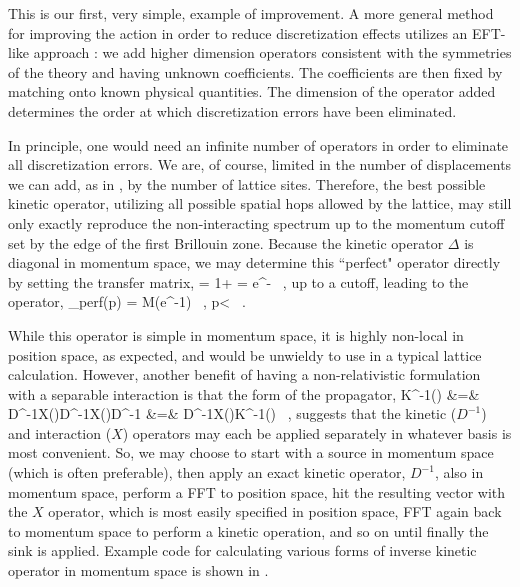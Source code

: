 This is our first, very simple, example of improvement. A more general method for improving the action in order to reduce discretization effects utilizes an EFT-like approach \cite{Symanzik1,Symanzik2,Symanzik3,Symanzik4,EKLN4}: we add higher dimension operators consistent with the symmetries of the theory and having unknown coefficients. The coefficients are then fixed by matching onto known physical quantities. The dimension of the operator added determines the order at which discretization errors have been eliminated.

In principle, one would need an infinite number of operators in order to eliminate all discretization errors. We are, of course, limited in the number of displacements we can add, as in , by the number of lattice sites. Therefore, the best possible kinetic operator, utilizing all possible spatial hops allowed by the lattice, may still only exactly reproduce the non-interacting spectrum up to the momentum cutoff set by the edge of the first Brillouin zone. Because the kinetic operator $\Delta$ is diagonal in momentum space, we may determine this ``perfect" operator directly by setting the transfer matrix,
\beq
{}= 1+ = e^{-} \ ,
\eeq
up to a cutoff, leading to the operator,
\beq
\label{eq:perfect}
\Delta_{\mbox{\tiny perf}}(p) = M\left(e^{}-1\right) \ , \qquad p<  \ .
\eeq

While this operator is simple in momentum space, it is highly non-local in position space, as expected, and would be unwieldy to use in a typical lattice calculation. However, another benefit of having a non-relativistic formulation with a separable interaction is that the form of the propagator, 
\beq
K^{-1}(\tau) &=& D^{-1}X(\tau)D^{-1}X()\cdots D^{-1} \cr
&=& D^{-1}X(\tau)K^{-1}() \ ,
\eeq
suggests that the kinetic ($D^{-1}$) and interaction ($X$) operators may each be applied separately in whatever basis is most convenient. So, we may choose to start with a source in momentum space (which is often preferable), then apply an exact kinetic operator, $D^{-1}$, also in momentum space, perform a FFT to position space, hit the resulting vector with the $X$ operator, which is most easily specified in position space, FFT again back to momentum space to perform a kinetic operation, and so on until finally the sink is applied. Example code for calculating various forms of inverse kinetic operator in momentum space is shown in .

